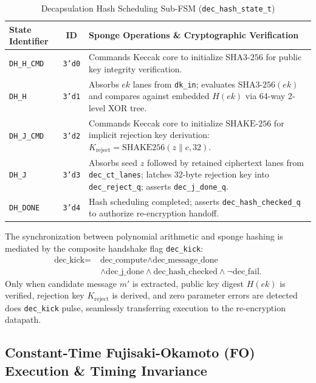 \begin{table}[!t]
\caption{Decapsulation Hash Scheduling Sub-FSM (\texttt{dec\_hash\_state\_t})}
\label{tab:decap_hash_fsm}
\centering
\footnotesize
\begin{tabular}{@{} l c p{4.9cm} @{}}
\toprule
\textbf{State Identifier} & \textbf{ID} & \textbf{Sponge Operations \& Cryptographic Verification} \\
\midrule
\texttt{DH\_H\_CMD} & \texttt{3'd0} & Commands Keccak core to initialize $\text{SHA3-256}$ for public key integrity verification. \\
\texttt{DH\_H} & \texttt{3'd1} & Absorbs $ek$ lanes from \texttt{dk\_in}; evaluates $\text{SHA3-256}(ek)$ and compares against embedded $H(ek)$ via 64-way 2-level XOR tree. \\
\texttt{DH\_J\_CMD} & \texttt{3'd2} & Commands Keccak core to initialize $\text{SHAKE-256}$ for implicit rejection key derivation: $K_{\text{reject}} = \text{SHAKE256}(z \parallel c, 32)$. \\
\texttt{DH\_J} & \texttt{3'd3} & Absorbs seed $z$ followed by retained ciphertext lanes from \texttt{dec\_ct\_lanes}; latches 32-byte rejection key into \texttt{dec\_reject\_q}; asserts \texttt{dec\_j\_done\_q}. \\
\texttt{DH\_DONE} & \texttt{3'd4} & Hash scheduling completed; asserts \texttt{dec\_hash\_checked\_q} to authorize re-encryption handoff. \\
\bottomrule
\end{tabular}
\end{table}

The synchronization between polynomial arithmetic and sponge hashing is mediated by the composite handshake flag \texttt{dec\_kick}:
\begin{equation}
\label{eq:dec_kick}
\begin{aligned}
\text{dec\_kick} = \; &\text{dec\_compute} \land \text{dec\_message\_done} \\
&\land \text{dec\_j\_done} \land \text{dec\_hash\_checked} \land \neg \text{dec\_fail}.
\end{aligned}
\end{equation}
Only when candidate message $m'$ is extracted, public key digest $H(ek)$ is verified, rejection key $K_{\text{reject}}$ is derived, and zero parameter errors are detected does \texttt{dec\_kick} pulse, seamlessly transferring execution to the re-encryption datapath.

\subsection{Constant-Time Fujisaki-Okamoto (FO) Execution \& Timing Invariance}
\label{sec:arch_fo_transform}


